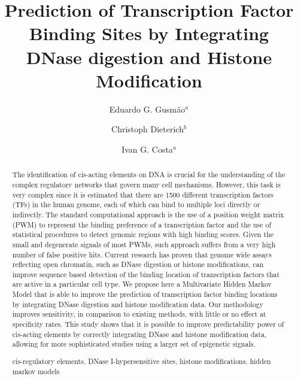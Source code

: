 \documentclass[runningheads,a4paper]{llncs}
\newcommand{\keywords}[1]{\par\addvspace\baselineskip
\noindent\keywordname\enspace\ignorespaces#1}
\begin{document}
\mainmatter

\title{Prediction of Transcription Factor Binding Sites by Integrating DNase digestion and Histone Modification}


\author{Eduardo G. Gusm\~{a}o$^a$\and Christoph Dieterich$^b$ \and Ivan G. Costa$^a$}


\maketitle

\begin{abstract}

  The identification of cis-acting elements on DNA is crucial for the
  understanding of the complex regulatory networks that govern many
  cell mechanisms. However, this task is very complex since it is
  estimated that there are 1500 different transcription factors (TFs) 
  in the human genome, each of which can bind to multiple loci directly or indirectly. The
  standard computational approach is the use of a position weight
  matrix (PWM) to represent the binding preference of a transcription
  factor and the use of statistical procedures to detect genomic
  regions with high binding scores. Given the small and degenerate
  signals of most PWMs, such approach suffers from a very high number
  of false positive hits. Current research has proven that genome wide
  assays reflecting open chromatin, such as DNase digestion or histone
  modifications, can improve sequence based detection of the binding
  location of transcription factors that are active in a particular
  cell type.  We propose here a Multivariate Hidden Markov Model that
  is able to improve the prediction of transcription factor binding
  locations by integrating DNase digestion and histone modification
  data. Our methodology improves sensitivity, in comparison to
  existing methods, with little or no effect at specificity rates.
  This study shows that it is possible to improve predictability power
  of cis-acting elements by correctly integrating DNase and histone
  modification data, allowing for more sophisticated studies using a
  larger set of epigenetic signals.  \keywords{cis-regulatory
    elements, DNase I-hypersensitive sites, histone modifications,
    hidden markov models}
\end{abstract}
\end{document}
